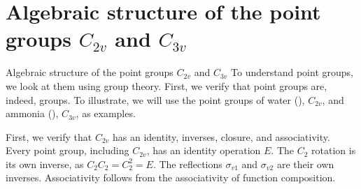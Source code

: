 \documentclass{beamer}
\newcommand{\vs}{\vspace{5mm}}
\begin{document}
    \section{\texorpdfstring{Algebraic structure of the point groups $C_{2v}$ and $C_{3v}$}{Algebraic structure of the point groups C2v and C3v}}

    \begin{frame}{Algebraic structure of the point groups $C_{2v}$ and $C_{3v}$}
        To understand point groups, we look at them using group theory. First, we verify that point groups are, indeed, groups. To illustrate, we will use the point groups of water (), $C_{2v}$, and ammonia (), $C_{3v}$, as examples.
        \vs

        {
            First, we verify that $C_{2v}$ has an identity, inverses, closure, and associativity. Every point group, including $C_{2v}$, has an identity operation $E$. The $C_2$ rotation is its own inverse, as $C_2C_2=C_2^2=E$. The reflections $\sigma_{v1}$ and $\sigma_{v2}$ are their own inverses. Associativity follows from the associativity of function composition.
        }
    \end{frame}
\end{document}
